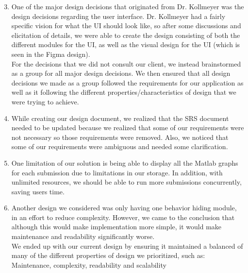 \documentclass[12pt, titlepage]{article}
\begin{document}
\begin{enumerate}
\setcounter{enumi}{2}
    \item One of the major design decisions that originated from Dr. Kollmeyer was the design decisions regarding the user interface. Dr. Kollmeyer had a fairly specific vision for what the UI should look like, so after some discussions and elicitation of details, we were able to create the design consisting of both the different modules for the UI, as well as the visual design for the UI (which is seen in the Figma design). \\

    For the decisions that we did not consult our client, we instead brainstormed as a group for all major design decisions. We then ensured that all design decisions we made as a group followed the requirements for our application as well as it following the different properties/characteristics of design that we were trying to achieve.
    \item While creating our design document, we realized that the SRS document needed to be updated because we realized that some of our requirements were not necessary so those requirements were removed. Also, we noticed that some of our requirements were ambiguous and needed some clarification.
    \item One limitation of our solution is being able to display all the Matlab graphs for each submission due to limitations in our storage. In addition, with unlimited resources, we should be able to run more submissions concurrently, saving users time. 
    \item Another design we considered was only having one behavior hiding module, in an effort to reduce complexity. However, we came to the conclusion that although this would make implementation more simple, it would make maintenance and readability significantly worse.\\

    We ended up with our current design by ensuring it maintained a balanced of many of the different properties of design we prioritized, such as: Maintenance, complexity, readability and scalability 
\end{enumerate}
\end{document}
